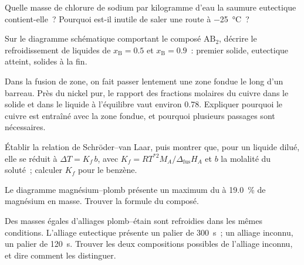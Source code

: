 \begin{exercise}[$\star\star$]\label{exo:b2:solid-liquid-diagrams:7}
Quelle masse de chlorure de sodium par kilogramme d'eau la saumure eutectique
contient-elle~? Pourquoi est-il inutile de saler une route à \qty{-25}{\degreeCelsius}~?
\end{exercise}

\begin{exercise}[$\star\star$]\label{exo:b2:solid-liquid-diagrams:8}
Sur le diagramme schématique comportant le composé $\mathrm{AB_2}$, décrire le
refroidissement de liquides de $x_{\mathrm B} = 0.5$ et $x_{\mathrm B} = 0.9$~: premier
solide, eutectique atteint, solides à la fin.
\end{exercise}

\begin{exercise}[$\star\star$]\label{exo:b2:solid-liquid-diagrams:9}
Dans la fusion de zone, on fait passer lentement une zone fondue le long d'un barreau. Près du nickel pur,
le rapport des fractions molaires du cuivre dans le solide et dans le liquide à
l'équilibre vaut environ 0.78. Expliquer pourquoi le cuivre est entraîné avec la
zone fondue, et pourquoi plusieurs passages sont nécessaires.
\end{exercise}

\begin{exercise}[$\star\star\star$]\label{exo:b2:solid-liquid-diagrams:10}
Établir la relation de Schröder--van Laar, puis montrer que, pour un liquide dilué,
elle se réduit à $\Delta T = K_f\,b$, avec $K_f = RT^{*2}M_A/\Delta_{\text{fus}}H_A$
et $b$ la molalité du soluté~; calculer $K_f$ pour le benzène.
\end{exercise}

\begin{exercise}[$\star\star\star$]\label{exo:b2:solid-liquid-diagrams:11}
Le diagramme magnésium--plomb présente un maximum du  à 19.0~\% de magnésium en
masse. Trouver la formule du composé.
\end{exercise}

\begin{exercise}[$\star\star\star$]\label{exo:b2:solid-liquid-diagrams:12}
Des masses égales d'alliages plomb--étain sont refroidies dans les mêmes conditions. L'alliage
eutectique présente un palier de \qty{300}{s}~; un alliage inconnu, un palier de
\qty{120}{s}. Trouver les deux compositions possibles de l'alliage inconnu, et dire comment
les distinguer.
\end{exercise}

